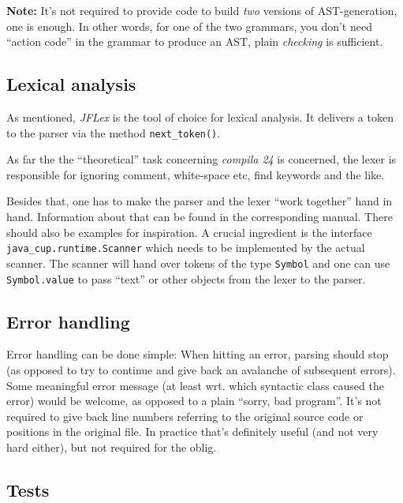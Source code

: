 \documentclass[10pt,freeform]{handout}[2014/08/13]
\begin{document}
\textbf{Note:} It's not required to provide code to build \emph{two}
versions of AST-generation, one is enough. In other words, for one of the
two grammars, you don't need ``action code'' in the grammar to produce an
AST, plain \emph{checking} is sufficient.

\subsection{Lexical analysis}
\label{sec:lexical-analysis}

As mentioned, \textsl{JFLex} is the tool of choice for lexical analysis. It
delivers a token to the parser via the method \texttt{next\_token()}.  

As far the the ``theoretical'' task concerning \textsl{compila 24} is
concerned, the lexer is responsible for ignoring comment, white-space etc,
find keywords and the like.

Besides that, one has to make the parser and the lexer ``work together''
hand in hand. Information about that can be found in the corresponding
manual. There should also be examples for inspiration. A crucial ingredient
is the interface \texttt{java\_cup.runtime.Scanner} which needs to be
implemented by the actual scanner. The scanner will hand over tokens of the
type \texttt{Symbol} and one can use \texttt{Symbol.value} to pass ``text''
or other objects from the lexer to the parser.



\subsection{Error handling}
\label{sec:error-handling}

Error handling can be done simple: When hitting an error, parsing should
stop (as opposed to try to continue and give back an avalanche of
subsequent errors). Some meaningful error message (at least wrt. which
syntactic class caused the error) would be welcome, as opposed to a plain
``sorry, bad program''. It's not required to give back line numbers
referring to the original source code or positions in the original
file. In practice that's definitely useful (and not very hard either), but
not required for the oblig.




\subsection{Tests}
\label{sec:tests}
\end{document}
